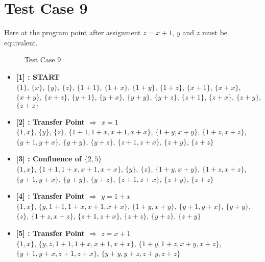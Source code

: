 \section{Test Case 9}
\label{sec:tc3}
Here at the program point after assignment $z = x + 1$, $y$ and $z$ must be 
equivalent.

\begin{figure}[H]
\label{fig:tc9}
    \caption{Test Case 9}
\end{figure}

\begin{itemize}

    \item \textbf{[1] : START}\\
        $\{1\}$, $\{x\}$, $\{y\}$, $\{z\}$, $\{1 + 1\}$, $\{1 + x\}$, $\{1 + y\}$, $\{1 + z\}$, $\{x + 1\}$, $\{x + x\}$, $\{x + y\}$, $\{x + z\}$, $\{y + 1\}$, $\{y + x\}$, $\{y + y\}$, $\{y + z\}$, $\{z + 1\}$, $\{z + x\}$, $\{z + y\}$, $\{z + z\}$

    \item \textbf{[2] : Transfer Point $\Rightarrow$ $x = 1$}\\
        $\{1, x\}$, $\{y\}$, $\{z\}$, $\{1 + 1, 1 + x, x + 1, x + x\}$, $\{1 + y, x + y\}$, $\{1 + z, x + z\}$, $\{y + 1, y + x\}$, $\{y + y\}$, $\{y + z\}$, $\{z + 1, z + x\}$, $\{z + y\}$, $\{z + z\}$

    \item \textbf{[3] : Confluence of $\{2, 5\}$}\\
        $\{1, x\}$, $\{1 + 1, 1 + x, x + 1, x + x\}$, $\{y\}$, $\{z\}$, $\{1 + y, x + y\}$, $\{1 + z, x + z\}$, $\{y + 1, y + x\}$, $\{y + y\}$, $\{y + z\}$, $\{z + 1, z + x\}$, $\{z + y\}$, $\{z + z\}$

    \item \textbf{[4] : Transfer Point $\Rightarrow$ $y = 1 + x$}\\
        $\{1, x\}$, $\{y, 1 + 1, 1 + x, x + 1, x + x\}$, $\{1 + y, x + y\}$, $\{y + 1, y + x\}$, $\{y + y\}$, $\{z\}$, $\{1 + z, x + z\}$, $\{z + 1, z + x\}$, $\{z + z\}$, $\{y + z\}$, $\{z + y\}$

    \item \textbf{[5] : Transfer Point $\Rightarrow$ $z = x + 1$}\\
        $\{1, x\}$, $\{y, z, 1 + 1, 1 + x, x + 1, x + x\}$, $\{1 + y, 1 + z, x + y, x + z\}$, $\{y + 1, y + x, z + 1, z + x\}$, $\{y + y, y + z, z + y, z + z\}$

\end{itemize}

